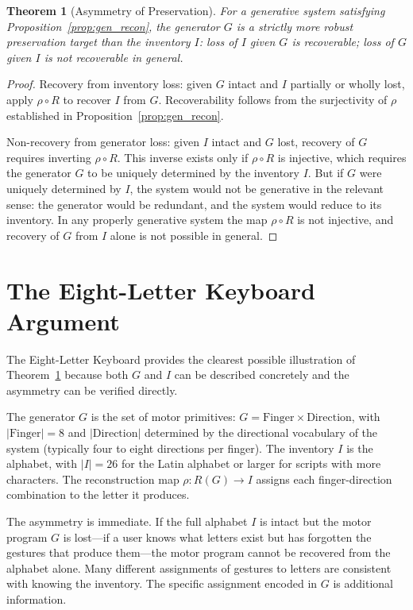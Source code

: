 \documentclass[12pt, oneside]{book}
\theoremstyle{flyxion}
\newtheorem{theorem}{Theorem}[chapter]
\theoremstyle{definition}
\begin{document}
\begin{theorem}[Asymmetry of Preservation]
\label{thm:asymmetry}
For a generative system satisfying Proposition~\ref{prop:gen_recon},
the generator $G$ is a strictly more robust preservation target
than the inventory $I$: loss of $I$ given $G$ is recoverable;
loss of $G$ given $I$ is not recoverable in general.
\end{theorem}

\begin{proof}
Recovery from inventory loss: given $G$ intact and $I$ partially
or wholly lost, apply $\rho \circ R$ to recover $I$ from $G$.
Recoverability follows from the surjectivity of $\rho$ established
in Proposition~\ref{prop:gen_recon}.

Non-recovery from generator loss: given $I$ intact and $G$ lost,
recovery of $G$ requires inverting $\rho \circ R$. This inverse
exists only if $\rho \circ R$ is injective, which requires the
generator $G$ to be uniquely determined by the inventory $I$. But
if $G$ were uniquely determined by $I$, the system would not be
generative in the relevant sense: the generator would be redundant,
and the system would reduce to its inventory. In any properly
generative system the map $\rho \circ R$ is not injective, and
recovery of $G$ from $I$ alone is not possible in general.
\end{proof}

\section{The Eight-Letter Keyboard Argument}

The Eight-Letter Keyboard provides the clearest possible illustration
of Theorem~\ref{thm:asymmetry} because both $G$ and $I$ can be
described concretely and the asymmetry can be verified directly.

The generator $G$ is the set of motor primitives:
$G = \mathrm{Finger} \times \mathrm{Direction}$, with $|\mathrm{Finger}|
= 8$ and $|\mathrm{Direction}|$ determined by the directional
vocabulary of the system (typically four to eight directions per
finger). The inventory $I$ is the alphabet, with $|I| = 26$ for
the Latin alphabet or larger for scripts with more characters.
The reconstruction map $\rho : R(G) \to I$ assigns each
finger-direction combination to the letter it produces.

The asymmetry is immediate. If the full alphabet $I$ is intact
but the motor program $G$ is lost---if a user knows what letters
exist but has forgotten the gestures that produce them---the
motor program cannot be recovered from the alphabet alone. Many
different assignments of gestures to letters are consistent with
knowing the inventory. The specific assignment encoded in $G$ is
additional information.
\end{document}
